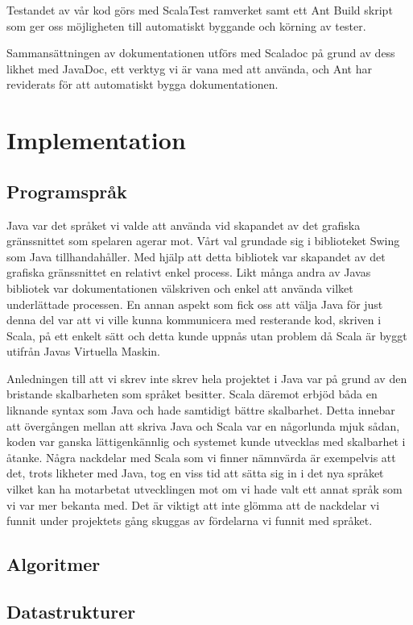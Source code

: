 \documentclass[a4paper]{article}
\begin{document}
Testandet av vår kod görs med ScalaTest ramverket samt ett Ant Build skript som ger oss möjligheten till automatiskt byggande och körning av tester.

Sammansättningen av dokumentationen utförs med Scaladoc på grund av dess likhet med JavaDoc, ett verktyg vi är vana med att använda, och Ant har reviderats för att automatiskt 
bygga dokumentationen.

\section{Implementation}

\subsection{Programspråk}
Java var det språket vi valde att använda vid skapandet av det grafiska gränssnittet som spelaren agerar mot. Vårt val grundade sig i biblioteket Swing som Java tillhandahåller. 
Med hjälp att detta bibliotek var skapandet av det grafiska gränssnittet en relativt enkel process. Likt många andra av Javas bibliotek var dokumentationen välskriven och enkel 
att använda vilket underlättade processen. En annan aspekt som fick oss att välja Java för just denna del var att vi ville kunna kommunicera med resterande kod, skriven i Scala, 
på ett enkelt sätt och detta kunde uppnås utan problem då Scala är byggt utifrån Javas Virtuella Maskin. 

Anledningen till att vi skrev inte skrev hela projektet i Java var på grund av den bristande skalbarheten som språket besitter. Scala däremot erbjöd båda en liknande syntax som 
Java och hade samtidigt bättre skalbarhet. Detta innebar att övergången mellan att skriva Java och Scala var en någorlunda mjuk sådan, koden var ganska lättigenkännlig och systemet 
kunde utvecklas med skalbarhet i åtanke. Några nackdelar med Scala som vi finner nämnvärda är exempelvis att det, trots likheter med Java, tog en viss tid att sätta sig in i det nya 
språket vilket kan ha motarbetat utvecklingen mot om vi hade valt ett annat språk som vi var mer bekanta med. Det är viktigt att inte glömma att de nackdelar vi funnit under 
projektets gång skuggas av fördelarna vi funnit med språket.

\subsection{Algoritmer}

\subsection{Datastrukturer}
\end{document}

